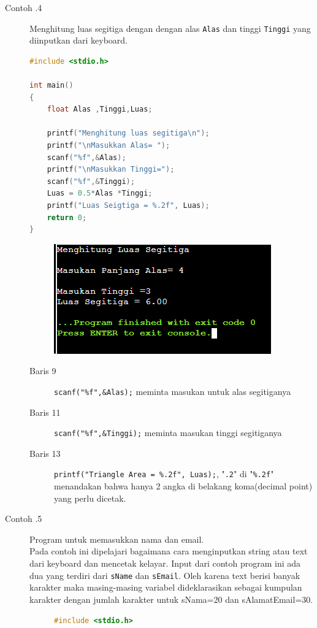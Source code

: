 \begin{description}
	\item  [Contoh \thesubsection.4] Menghitung luas segitiga dengan  dengan alas \verb*|Alas|   dan tinggi \verb*|Tinggi| yang diinputkan dari keyboard.
	      \begin{lstlisting}[language=c]
#include <stdio.h>

int main()
{
	float Alas ,Tinggi,Luas;
	
	printf("Menghitung luas segitiga\n");
	printf("\nMasukkan Alas= ");
	scanf("%f",&Alas);
	printf("\nMasukkan Tinggi=");
	scanf("%f",&Tinggi);
	Luas = 0.5*Alas *Tinggi;
	printf("Luas Seigtiga = %.2f", Luas);
	return 0;
}
	\end{lstlisting}
	      \begin{figure}[H]
		      \centering
		      \includegraphics[width=0.5\linewidth]{P1/img/screenshot0005.png}
		      \caption{}
		      \label{fig:screenshot0005}
	      \end{figure}

	      \begin{description}
		      \item [Baris 9]\verb|scanf("%f",&Alas);| meminta masukan untuk alas segitiganya
		      \item [Baris 11]\verb|scanf("%f",&Tinggi);| meminta masukan tinggi segitiganya
		      \item [Baris 13]\verb|printf("Triangle Area = %.2f", Luas);|,  "\verb|.2|" di "\verb|%.2f|" menandakan bahwa hanya 2 angka di belakang koma(decimal point) yang perlu dicetak.
	      \end{description}

	\item[Contoh \thesubsection.5] Program untuk memasukkan nama dan email.\\
		Pada contoh ini dipelajari bagaimana cara menginputkan string atau text dari keyboard dan mencetak kelayar. Input dari contoh program ini ada dua yang terdiri dari \verb|sName| dan \verb|sEmail|. Oleh karena text berisi banyak karakter maka masing-masing variabel dideklarasikan sebagai kumpulan karakter dengan jumlah karakter untuk sNama=20 dan sAlamatEmail=30.
		\begin{figure}[H]
			\begin{lstlisting}[language=c]
				#include <stdio.h>
				

\end{lstlisting}
\end{figure}
\end{description}
